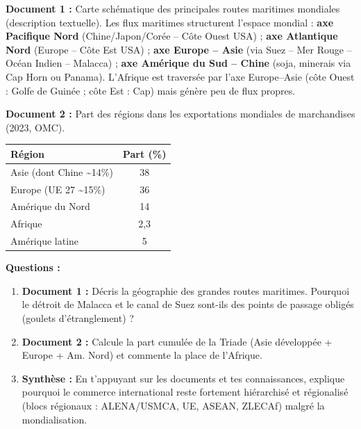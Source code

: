 \documentclass[11pt]{article}
\newcommand{\cle}[1]{{\popxbold\color{popdark}#1}}
\begin{document}
\begin{exercice}
\textbf{Document 1 :} Carte schématique des principales routes maritimes mondiales (description textuelle).
\og Les flux maritimes structurent l'espace mondial : \textbf{axe Pacifique Nord} (Chine/Japon/Corée -- Côte Ouest USA) ; \textbf{axe Atlantique Nord} (Europe -- Côte Est USA) ; \textbf{axe Europe -- Asie} (via Suez -- Mer Rouge -- Océan Indien -- Malacca) ; \textbf{axe Amérique du Sud -- Chine} (soja, minerais via Cap Horn ou Panama). L'Afrique est traversée par l'axe Europe--Asie (côte Ouest : Golfe de Guinée ; côte Est : Cap) mais génère peu de flux propres.\fg

\textbf{Document 2 :} Part des régions dans les exportations mondiales de marchandises (2023, OMC).
\begin{center}
\begin{tabular}{|l|c|}\hline
\textbf{Région} & \textbf{Part (\%)} \\ \hline
Asie (dont Chine \textasciitilde 14\%) & 38 \\ \hline
Europe (UE 27 \textasciitilde 15\%) & 36 \\ \hline
Amérique du Nord & 14 \\ \hline
Afrique & 2,3 \\ \hline
Amérique latine & 5 \\ \hline
\end{tabular}
\end{center}

\textbf{Questions :}
\begin{enumerate}
    \item \textbf{Document 1 :} Décris la géographie des grandes routes maritimes. Pourquoi le détroit de Malacca et le canal de Suez sont-ils des \cle{points de passage obligés} (goulets d'étranglement) ?
    \item \textbf{Document 2 :} Calcule la part cumulée de la Triade (Asie développée + Europe + Am. Nord) et commente la place de l'Afrique.
    \item \textbf{Synthèse :} En t'appuyant sur les documents et tes connaissances, explique pourquoi le commerce international reste fortement \cle{hiérarchisé} et \cle{régionalisé} (blocs régionaux : ALENA/USMCA, UE, ASEAN, ZLECAf) malgré la mondialisation.
\end{enumerate}
\end{exercice}
\end{document}
